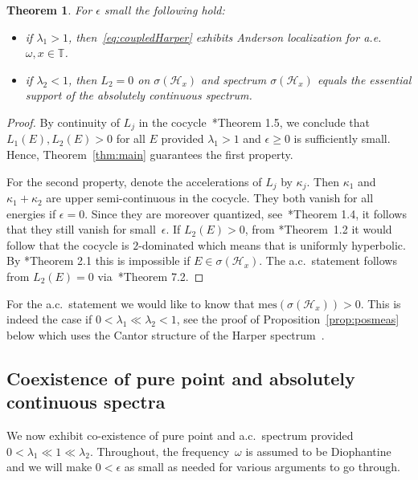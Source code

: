 \documentclass[11pt]{amsart}
\newtheorem{theorem}{Theorem}[section]
\def\mes{\mathrm{mes}}
\def\calH{\mathcal{H}}
\def\tor{\mathbb{T}}
\begin{document}
\begin{theorem}
    \label{thm:puretype}
    For $\epsilon$ small the following hold:
    \begin{itemize}
        \item if $\lambda_1>1$, then~\eqref{eq:coupledHarper} exhibits Anderson localization for a.e.~$\omega, x\in\tor$.
        \item if $\lambda_2<1$, then $L_2=0$ on $\sigma(\calH_x)$ and spectrum $\sigma(\calH_x)$ equals the essential support of the absolutely continuous spectrum. 
    \end{itemize}
\end{theorem}
\begin{proof}
    By continuity of $L_j$ in the cocycle~\cite{AJS}*{Theorem 1.5}, we conclude that $L_1(E), L_2(E)>0$ for all $E$ provided $\lambda_1>1$ and $\epsilon\ge0$ is sufficiently small. Hence, Theorem~\ref{thm:main} guarantees  the first property. 

    For the second property, denote the accelerations of $L_j$ by $\kappa_j$. Then $\kappa_1$ and $\kappa_1+\kappa_2$ are upper semi-continuous in the cocycle. They both vanish for all energies if $\epsilon=0$. Since they are moreover quantized, see~\cite{AJS}*{Theorem 1.4}, it follows that they still vanish for small~$\epsilon$. If  $L_2(E)>0$, from \cite{AJS}*{Theorem~1.2} it would follow that the cocycle is $2$-dominated which means that is uniformly hyperbolic. By \cite{HP}*{Theorem 2.1} this is impossible if $E\in\sigma(\calH_x)$. The a.c.~statement follows from $L_2(E)=0$ via~\cite{KS}*{Theorem 7.2}. 
\end{proof}

For the a.c.\ statement we would like to know that $\mes(\sigma(\calH_x))>0$. This is indeed the case if $0<\lambda_1\ll \lambda_2<1$, see the proof of Proposition~\ref{prop:posmeas} below which uses the Cantor structure of the Harper spectrum~\cite{Pu}.


\subsection{Coexistence of pure point and absolutely continuous spectra}
We now exhibit co-existence of pure point and a.c.~spectrum provided 
$0<\lambda_1\ll 1\ll \lambda_2$. Throughout, the frequency~$\omega$ is assumed to be Diophantine and we will make $0<\epsilon$ as small as needed for various arguments to go through.   
\end{document}

